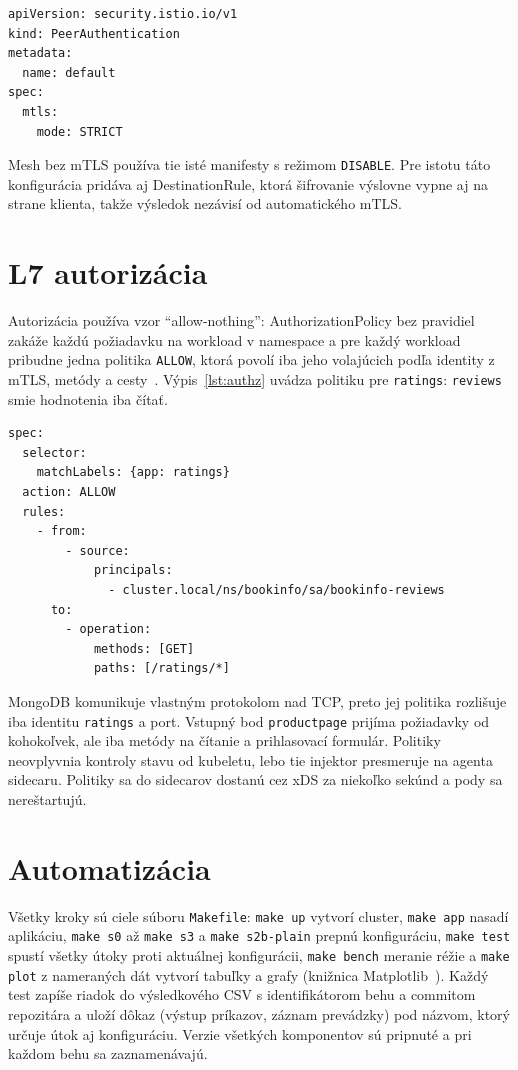 \begin{lstlisting}[language={},basicstyle=\ttfamily\footnotesize,caption={PeerAuthentication pre namespace \texttt{bookinfo}},label={lst:peerauth}]
apiVersion: security.istio.io/v1
kind: PeerAuthentication
metadata:
  name: default
spec:
  mtls:
    mode: STRICT
\end{lstlisting}

Mesh bez mTLS používa tie isté manifesty s režimom \texttt{DISABLE}. Pre istotu táto konfigurácia pridáva aj DestinationRule, ktorá šifrovanie výslovne vypne aj na strane klienta, takže výsledok nezávisí od automatického mTLS.

\section{L7 autorizácia}

Autorizácia používa vzor \enquote{allow-nothing}: AuthorizationPolicy bez pravidiel zakáže každú požiadavku na workload v namespace a pre každý workload pribudne jedna politika \texttt{ALLOW}, ktorá povolí iba jeho volajúcich podľa identity z mTLS, metódy a cesty~\cite{istio-authorizationpolicy}. Výpis~\ref{lst:authz} uvádza politiku pre \texttt{ratings}: \texttt{reviews} smie hodnotenia iba čítať.

\begin{lstlisting}[language={},basicstyle=\ttfamily\footnotesize,caption={AuthorizationPolicy pre \texttt{ratings}},label={lst:authz}]
spec:
  selector:
    matchLabels: {app: ratings}
  action: ALLOW
  rules:
    - from:
        - source:
            principals:
              - cluster.local/ns/bookinfo/sa/bookinfo-reviews
      to:
        - operation:
            methods: [GET]
            paths: [/ratings/*]
\end{lstlisting}

MongoDB komunikuje vlastným protokolom nad TCP, preto jej politika rozlišuje iba identitu \texttt{ratings} a port. Vstupný bod \texttt{productpage} prijíma požiadavky od kohokoľvek, ale iba metódy na čítanie a prihlasovací formulár. Politiky neovplyvnia kontroly stavu od kubeletu, lebo tie injektor presmeruje na agenta sidecaru. Politiky sa do sidecarov dostanú cez xDS za niekoľko sekúnd a pody sa nereštartujú.

\section{Automatizácia}

Všetky kroky sú ciele súboru \texttt{Makefile}: \texttt{make up} vytvorí cluster, \texttt{make app} nasadí aplikáciu, \texttt{make s0} až \texttt{make s3} a \texttt{make s2b-plain} prepnú konfiguráciu, \texttt{make test} spustí všetky útoky proti aktuálnej konfigurácii, \texttt{make bench} meranie réžie a \texttt{make plot} z nameraných dát vytvorí tabuľky a grafy (knižnica Matplotlib~\cite{matplotlib}). Každý test zapíše riadok do výsledkového CSV s identifikátorom behu a commitom repozitára a uloží dôkaz (výstup príkazov, záznam prevádzky) pod názvom, ktorý určuje útok aj konfiguráciu. Verzie všetkých komponentov sú pripnuté a pri každom behu sa zaznamenávajú.
